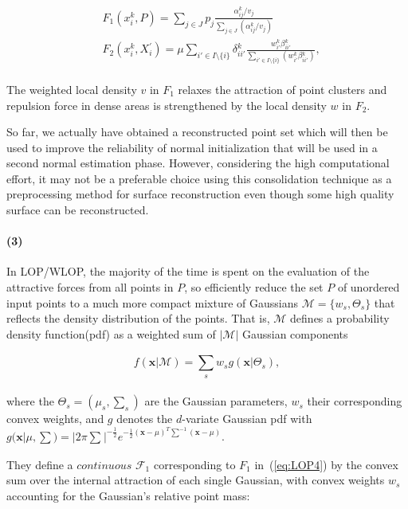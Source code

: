 \small{
\begin{equation}
 \label{eq:WLOP}
 \begin{split}
 & F_1(x{_i^k},P)=\sum_{j\in J}^{}p_{j}\frac{\alpha{_{ij}^k}/v_{j}}{\sum_{j\in J}^{}(\alpha{_{ij}^k}/v_{j})}\\
 & F_2(x{_i^k},X{_i^{'}})=\mu\sum_{{i'}\in I\setminus\{i\}}^{}\delta{_{ii'}^k}\frac{w{_{i'}^k}\beta{_{ii'}^k}}{\sum_{{i'}\in I\setminus\{i\}}^{}(w{_{i'}^k}\beta{_{ii'}^k})},
 \end{split}
\end{equation}
}
\\
The weighted local density $v$ in $F_1$ relaxes the attraction of point clusters and repulsion force in dense areas is strengthened by the local density $w$ in $F_2$.

So far, we actually have obtained a reconstructed point set which will then be used to improve the reliability of normal initialization that will be used in a second normal estimation phase.
However, considering the high computational effort, it may not be a preferable choice using this consolidation technique as a preprocessing method for surface reconstruction even though some high quality surface can be reconstructed.


\paragraph{(3)}
In LOP/WLOP, the majority of the time is spent on the evaluation of the attractive forces from all points in $P$,
so \cite{preiner2014CPF} efficiently reduce the set $P$ of unordered input points to a much more compact mixture of Gaussians $\mathcal{M}=\{w_{s},\Theta_{s}\}$ that reflects the density distribution of the points.
That is, $\mathcal{M}$ defines a probability density function(pdf) as a weighted sum of $|\mathcal{M}|$ Gaussian components

\small{
\begin{equation}
 \label{eq:CLOP1}
 f(\mathbf{x}|\mathcal{M})=\sum_{s}^{}w_{s}g(\mathbf{x}|\Theta_{s}),
\end{equation}
}
\\
where the $\Theta_{s}=(\mu_{s},\sum_{s}^{})$ are the Gaussian parameters, $w_{s}$ their corresponding convex weights, and $g$ denotes the $d$-variate Gaussian pdf with $g(\mathbf{x}|\mu,\sum)=|2\pi\sum_{}^{}|^{-\frac{1}{2}}e^{-\frac{1}{2}(\mathbf{x}-\mu)^{T}\sum_{}^{-1}(\mathbf{x}-\mu)}$.

They define a $continuous$ $\mathcal{F}_1$ corresponding to $F_1$ in~(\ref{eq:LOP4}) by the convex sum over the internal attraction of each single Gaussian, with convex weights $w_s$ accounting for the Gaussian's relative point mass:

